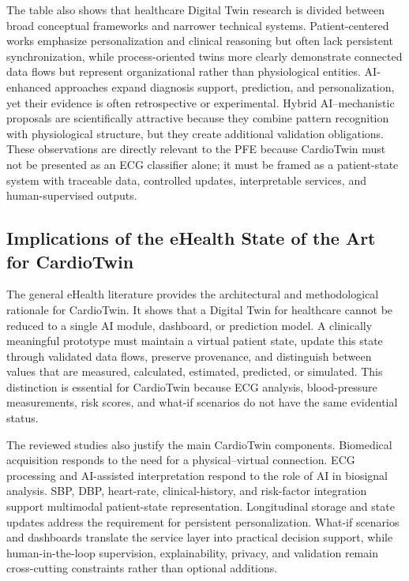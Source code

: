 The table also shows that healthcare Digital Twin research is divided between broad conceptual frameworks and narrower technical systems. Patient-centered works emphasize personalization and clinical reasoning but often lack persistent synchronization, while process-oriented twins more clearly demonstrate connected data flows but represent organizational rather than physiological entities. AI-enhanced approaches expand diagnosis support, prediction, and personalization, yet their evidence is often retrospective or experimental. Hybrid AI--mechanistic proposals are scientifically attractive because they combine pattern recognition with physiological structure, but they create additional validation obligations. These observations are directly relevant to the PFE because CardioTwin must not be presented as an ECG classifier alone; it must be framed as a patient-state system with traceable data, controlled updates, interpretable services, and human-supervised outputs.

\subsection{Implications of the eHealth State of the Art for CardioTwin}
The general eHealth literature provides the architectural and methodological rationale for CardioTwin. It shows that a Digital Twin for healthcare cannot be reduced to a single AI module, dashboard, or prediction model. A clinically meaningful prototype must maintain a virtual patient state, update this state through validated data flows, preserve provenance, and distinguish between values that are measured, calculated, estimated, predicted, or simulated. This distinction is essential for CardioTwin because ECG analysis, blood-pressure measurements, risk scores, and what-if scenarios do not have the same evidential status.

The reviewed studies also justify the main CardioTwin components. Biomedical acquisition responds to the need for a physical--virtual connection. ECG processing and AI-assisted interpretation respond to the role of AI in biosignal analysis. SBP, DBP, heart-rate, clinical-history, and risk-factor integration support multimodal patient-state representation. Longitudinal storage and state updates address the requirement for persistent personalization. What-if scenarios and dashboards translate the service layer into practical decision support, while human-in-the-loop supervision, explainability, privacy, and validation remain cross-cutting constraints rather than optional additions.

